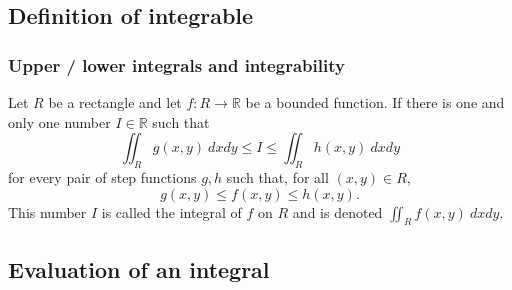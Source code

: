 \documentclass[aspectratio=169,handout]{beamer}
\newcommand{\bR}{\mathbb{R}} %
\begin{document}

\subsection{Definition of integrable}


\begin{frame}
    \frametitle{Upper / lower integrals and integrability}

    \begin{definition}[integrability]
        Let \(R\) be a rectangle and let \(f: R \to \bR\) be a bounded function.
        If there is one and only one number \(I\in \bR\) such that
        \[
            \iint_{R} g(x,y) \ dxdy \leq I \leq \iint_{R} h(x,y) \ dxdy
        \]
        for every pair of step functions \( g, h\) such that, for all \((x,y)\in R\),
        \[
            g(x,y) \leq f(x,y) \leq h(x,y).
        \]
        This number \(I\) is called the integral of \(f\) on \(R\) and is denoted \(\iint_{R} f(x,y) \ dxdy\).
    \end{definition}


\end{frame}


\subsection{Evaluation of an integral}
\end{document}
